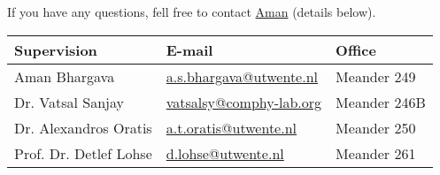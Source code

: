 \documentclass[a4paper,10pt]{article}
\begin{document}
If you have any questions, fell free to contact \href{mailto:a.s.bhargava@utwente.nl}{Aman} (details below).
\begin{center}
\begin{tabular}{|l|l|l|}
\hline \textbf{Supervision} & \textbf{E-mail} & \textbf{Office} \\
\hline Aman Bhargava & \href{mailto:a.s.bhargava@utwente.nl}{a.s.bhargava@utwente.nl} & Meander 249 \\
\hline Dr. Vatsal Sanjay & \href{mailto:vatsalsy@comphy-lab.org}{vatsalsy@comphy-lab.org} & Meander 246B \\
\hline Dr. Alexandros Oratis   & \href{mailto:a.t.oratis@utwente.nl}{a.t.oratis@utwente.nl}& Meander 250 \\
\hline Prof. Dr. Detlef Lohse & \href{mailto:d.lohse@utwente.nl}{d.lohse@utwente.nl} & Meander 261  \\
\hline
\end{tabular}
\end{center}

\printbibliography
\end{document}
